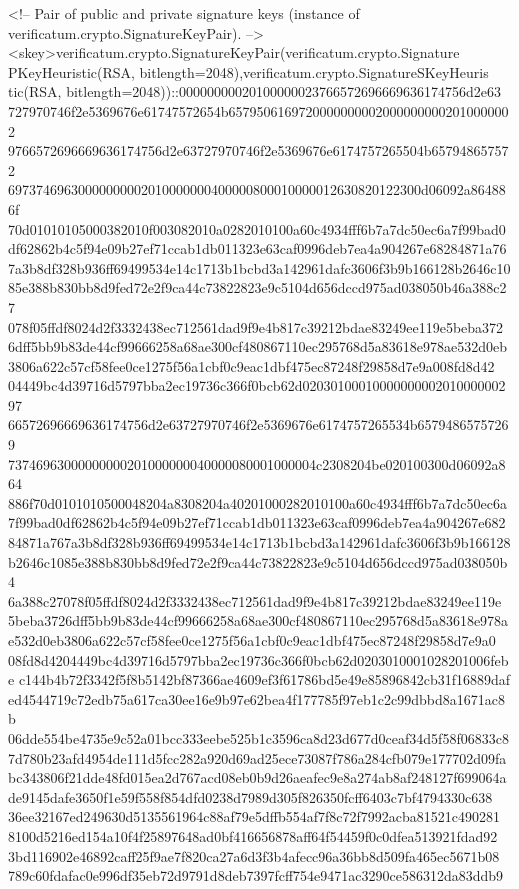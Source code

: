    <!-- Pair of public and private signature keys (instance of 
        verificatum.crypto.SignatureKeyPair). -->
   <skey>verificatum.crypto.SignatureKeyPair(verificatum.crypto.Signature
PKeyHeuristic(RSA, bitlength=2048),verificatum.crypto.SignatureSKeyHeuris
tic(RSA, bitlength=2048))::00000000020100000023766572696669636174756d2e63
727970746f2e5369676e61747572654b65795061697200000000020000000002010000002
9766572696669636174756d2e63727970746f2e5369676e6174757265504b657948657572
69737469630000000002010000000400000800010000012630820122300d06092a864886f
70d01010105000382010f003082010a0282010100a60c4934fff6b7a7dc50ec6a7f99bad0
df62862b4c5f94e09b27ef71ccab1db011323e63caf0996deb7ea4a904267e68284871a76
7a3b8df328b936ff69499534e14c1713b1bcbd3a142961dafc3606f3b9b166128b2646c10
85e388b830bb8d9fed72e2f9ca44c73822823e9c5104d656dccd975ad038050b46a388c27
078f05ffdf8024d2f3332438ec712561dad9f9e4b817c39212bdae83249ee119e5beba372
6dff5bb9b83de44cf99666258a68ae300cf480867110ec295768d5a83618e978ae532d0eb
3806a622c57cf58fee0ce1275f56a1cbf0c9eac1dbf475ec87248f29858d7e9a008fd8d42
04449bc4d39716d5797bba2ec19736c366f0bcb62d0203010001000000000201000000297
66572696669636174756d2e63727970746f2e5369676e6174757265534b65794865757269
73746963000000000201000000040000080001000004c2308204be020100300d06092a864
886f70d0101010500048204a8308204a40201000282010100a60c4934fff6b7a7dc50ec6a
7f99bad0df62862b4c5f94e09b27ef71ccab1db011323e63caf0996deb7ea4a904267e682
84871a767a3b8df328b936ff69499534e14c1713b1bcbd3a142961dafc3606f3b9b166128
b2646c1085e388b830bb8d9fed72e2f9ca44c73822823e9c5104d656dccd975ad038050b4
6a388c27078f05ffdf8024d2f3332438ec712561dad9f9e4b817c39212bdae83249ee119e
5beba3726dff5bb9b83de44cf99666258a68ae300cf480867110ec295768d5a83618e978a
e532d0eb3806a622c57cf58fee0ce1275f56a1cbf0c9eac1dbf475ec87248f29858d7e9a0
08fd8d4204449bc4d39716d5797bba2ec19736c366f0bcb62d0203010001028201006febe
c144b4b72f3342f5f8b5142bf87366ae4609ef3f61786bd5e49e85896842cb31f16889daf
ed4544719c72edb75a617ca30ee16e9b97e62bea4f177785f97eb1c2c99dbbd8a1671ac8b
06dde554be4735e9c52a01bcc333eebe525b1c3596ca8d23d677d0ceaf34d5f58f06833c8
7d780b23afd4954de111d5fcc282a920d69ad25ece73087f786a284cfb079e177702d09fa
bc343806f21dde48fd015ea2d767acd08eb0b9d26aeafec9e8a274ab8af248127f699064a
de9145dafe3650f1e59f558f854dfd0238d7989d305f826350fcff6403c7bf4794330c638
36ee32167ed249630d5135561964c88af79e5dffb554af7f8c72f7992acba81521c490281
8100d5216ed154a10f4f25897648ad0bf416656878aff64f54459f0c0dfea513921fdad92
3bd116902e46892caff25f9ae7f820ca27a6d3f3b4afecc96a36bb8d509fa465ec5671b08
789c60fdafac0e996df35eb72d9791d8deb7397fcff754e9471ac3290ce586312da83ddb9
